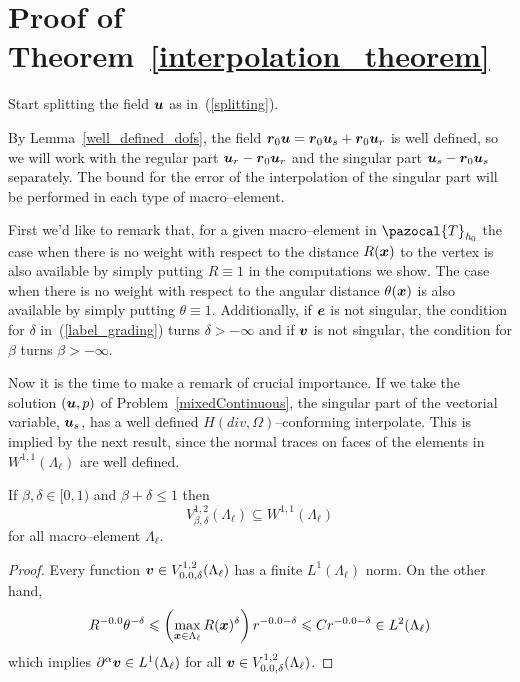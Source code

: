 \section{Proof of Theorem~\ref{interpolation_theorem}}
Start splitting the field $\boldsymbol{u}$ as in~(\ref{splitting}).

By Lemma~\ref{well_defined_dofs}, the field $\boldsymbol{r}_{0}\boldsymbol{u} = \boldsymbol{r}_0\boldsymbol{u}_s + \boldsymbol{r}_0\boldsymbol{u}_r$ 
is well defined, so we will work 
with the regular part $\boldsymbol{u}_r - \boldsymbol{r}_0\boldsymbol{u}_r$ and the singular part $\boldsymbol{u}_s - \boldsymbol{r}_0\boldsymbol{u}_s$
separately. The bound for the error of the interpolation of the singular part will be 
performed in each type of macro--element.

First we'd like to remark that, for a given macro--element in 
$\pazocal{T}_{\textit{h}_0}$ the case when there is no weight with respect to 
the distance $R(\boldsymbol{x})$
to the vertex is also available by simply putting 
$R\equiv 1$ in the computations we show. The case when there is no weight with 
respect to the angular distance
$\theta(\boldsymbol{x})$ is also available by simply putting 
$\theta\equiv 1.$ Additionally, if $\boldsymbol{e}$ is not singular, the condition for 
$\delta$ in~(\ref{label_grading}) 
turns $\delta > -\infty$ and if $\boldsymbol{v}$ is not singular, the condition for $\beta$
turns $\beta > -\infty.$

Now it is the time to make a remark of crucial importance. If we take the
solution $(\boldsymbol{u}, p)$ of Problem~\ref{mixedContinuous},
the singular part of the vectorial variable, $\boldsymbol{u}_s$, has a well defined $H(div, \Omega)$--conforming interpolate.
This is implied by the next result, since the normal traces on faces
of the elements in $W^{1,1}(\Lambda_\ell)$ are well defined.
\begin{lemma}\label{well_defined_dofs}
If $\beta,\delta\in[0,1)$ and $\beta + \delta\leqslant 1$ then 
\[
  V^{1,2}_{\beta,\delta}(\Lambda_\ell) \subseteq W^{1,1}(\Lambda_\ell)
\]
for all macro--element $\Lambda_{\ell}$.
\end{lemma}
\begin{proof}
Every function ${\bv}\in V^{1,2}_{\beta,\delta}(\Lambda_\ell)$ has a finite
$L^1(\Lambda_\ell)$ norm. On the other hand,
\[
  R^{-\beta}\theta^{-\delta}\leqslant\left(\max_{\bx
  \in\Lambda_\ell}R(\bx)^\delta\right)
  r^{-\beta-\delta}
  \leqslant C r^{-\beta-\delta}\in L^2(\Lambda_\ell)
\]
which implies $\partial^\alpha{\boldsymbol{v}}\in L^1(\Lambda_\ell)$ for all
$\bv\in V^{1,2}_{\beta,\delta}(\Lambda_\ell)$.
\end{proof}


